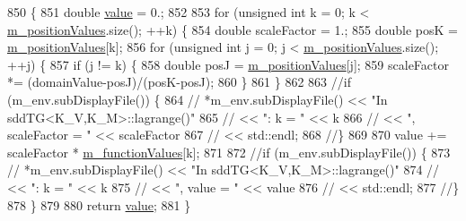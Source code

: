 \begin{DoxyCode}
850 \{
851   \textcolor{keywordtype}{double} \hyperlink{class_q_u_e_s_o_1_1_lagrange_polynomial1_d1_d_function_ada2741739cc9ff0fe98bb51e690df072}{value} = 0.;
852 
853   \textcolor{keywordflow}{for} (\textcolor{keywordtype}{unsigned} \textcolor{keywordtype}{int} k = 0; k < \hyperlink{class_q_u_e_s_o_1_1_lagrange_polynomial1_d1_d_function_a192c6dcd8bdba6177830fc1398ce5b01}{m\_positionValues}.size(); ++k) \{
854     \textcolor{keywordtype}{double} scaleFactor = 1.;
855     \textcolor{keywordtype}{double} posK = \hyperlink{class_q_u_e_s_o_1_1_lagrange_polynomial1_d1_d_function_a192c6dcd8bdba6177830fc1398ce5b01}{m\_positionValues}[k];
856     \textcolor{keywordflow}{for} (\textcolor{keywordtype}{unsigned} \textcolor{keywordtype}{int} j = 0; j < \hyperlink{class_q_u_e_s_o_1_1_lagrange_polynomial1_d1_d_function_a192c6dcd8bdba6177830fc1398ce5b01}{m\_positionValues}.size(); ++j) \{
857       \textcolor{keywordflow}{if} (j != k) \{
858         \textcolor{keywordtype}{double} posJ = \hyperlink{class_q_u_e_s_o_1_1_lagrange_polynomial1_d1_d_function_a192c6dcd8bdba6177830fc1398ce5b01}{m\_positionValues}[j];
859         scaleFactor *= (domainValue-posJ)/(posK-posJ);
860       \}
861     \}
862 
863     \textcolor{comment}{//if (m\_env.subDisplayFile()) \{}
864     \textcolor{comment}{//  *m\_env.subDisplayFile() << "In sddTG<K\_V,K\_M>::lagrange()"}
865     \textcolor{comment}{//                          << ": k = " << k}
866     \textcolor{comment}{//                          << ", scaleFactor = " << scaleFactor}
867     \textcolor{comment}{//                          << std::endl;}
868     \textcolor{comment}{//\}}
869 
870     value += scaleFactor * \hyperlink{class_q_u_e_s_o_1_1_lagrange_polynomial1_d1_d_function_aa6dc315c563b9b83a88cd3f280a75aa4}{m\_functionValues}[k];
871 
872     \textcolor{comment}{//if (m\_env.subDisplayFile()) \{}
873     \textcolor{comment}{//  *m\_env.subDisplayFile() << "In sddTG<K\_V,K\_M>::lagrange()"}
874     \textcolor{comment}{//                          << ": k = " << k}
875     \textcolor{comment}{//                          << ", value = " << value}
876     \textcolor{comment}{//                          << std::endl;}
877     \textcolor{comment}{//\}}
878   \}
879 
880   \textcolor{keywordflow}{return} \hyperlink{class_q_u_e_s_o_1_1_lagrange_polynomial1_d1_d_function_ada2741739cc9ff0fe98bb51e690df072}{value};
881 \}
\end{DoxyCode}



